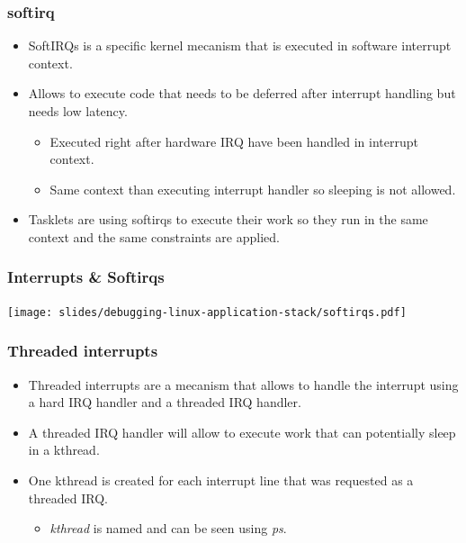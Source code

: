 \begin{frame}
  \frametitle{softirq}
  \begin{itemize}
    \item SoftIRQs is a specific kernel mecanism that is executed in
          software interrupt context.
    \item Allows to execute code that needs to be deferred after interrupt
          handling but needs low latency.
    \begin{itemize}
      \item Executed right after hardware IRQ have been handled in interrupt
            context.
      \item Same context than executing interrupt handler so sleeping is not
            allowed.
    \end{itemize}
    \item Tasklets are using softirqs to execute their work so they run in the
          same context and the same constraints are applied.
  \end{itemize}
\end{frame}

\begin{frame}
  \frametitle{Interrupts \& Softirqs}
  \texttt{[image: slides/debugging-linux-application-stack/softirqs.pdf]}
\end{frame}

\begin{frame}
  \frametitle{Threaded interrupts}
  \begin{itemize}
    \item Threaded interrupts are a mecanism that allows to handle the interrupt
          using a hard IRQ handler and a threaded IRQ handler.
    \item A threaded IRQ handler will allow to execute work that can potentially
          sleep in a kthread.
    \item One kthread is created for each interrupt line that was requested as
          a threaded IRQ.
    \begin{itemize}
      \item {\em kthread} is named  and can be seen using {\em ps}.
    \end{itemize}
  \end{itemize}
\end{frame}


